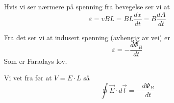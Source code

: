 Hvis vi ser nærmere på spenning fra bevegelse ser vi at
$$\varepsilon = vBL
  = B L \frac{dx}{dt}
  = B \frac{dA}{dt}$$

Fra det ser vi at indusert spenning (avhengig av vei) er
$$\varepsilon = - \frac{d\Phi_B}{dt}$$
Som er Faradays lov.

Vi vet fra før at $V=E\cdot L$ så
$$\oint \vec{E}\cdot d\vec{l} = - \frac{d\Phi_B}{dt}$$

